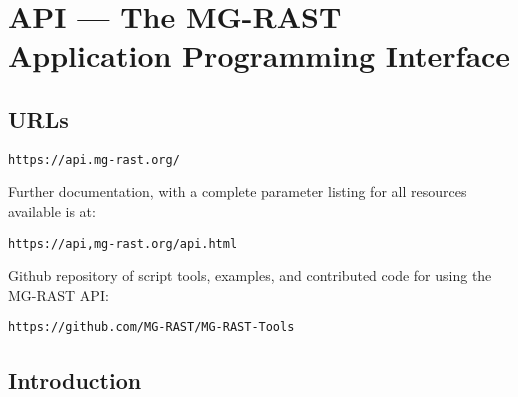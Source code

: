 \chapter{API --- The MG-RAST Application Programming Interface}
\label{API}

% 

\section{URLs}
\begin{small}
\begin{verbatim}
https://api.mg-rast.org/
\end{verbatim}
\end{small} Further documentation, with a complete parameter listing for all resources available is at:
\begin{small}
\begin{verbatim}
https://api,mg-rast.org/api.html
\end{verbatim}
\end{small} Github repository of script tools, examples, and contributed code for using the MG-RAST API:
\begin{small}
\begin{verbatim}
https://github.com/MG-RAST/MG-RAST-Tools
\end{verbatim}
\end{small}
\section{Introduction}


